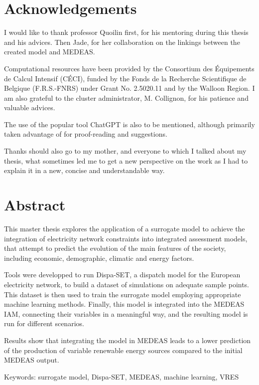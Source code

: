 \section*{Acknowledgements}

I would like to thank professor Quoilin first, for his mentoring during this thesis and his advices. Then Jade, for her collaboration on the linkings between the created model and MEDEAS.

Computational resources have been provided by the Consortium des Équipements de Calcul Intensif (CÉCI), funded by the Fonds de la Recherche Scientifique de Belgique (F.R.S.-FNRS) under Grant No. 2.5020.11 and by the Walloon Region. I am also grateful to the cluster administrator, M. Collignon, for his patience and valuable advices.

The use of the popular tool ChatGPT \cite{chatgpt} is also to be mentioned, although primarily taken advantage of for proof-reading and suggestions.

Thanks should also go to my mother, and everyone to which I talked about my thesis, what sometimes led me to get a new perspective on the work as I had to explain it in a new, concise and understandable way.

\newpage

\section*{Abstract}

This master thesis explores the application of a surrogate model to achieve the integration of electricity network constraints into integrated assessment models, that attempt to predict the evolution of the main features of the society, including economic, demographic, climatic and energy factors.

Tools were developped to run Dispa-SET, a dispatch model for the European electricity network, to build a dataset of simulations on adequate sample points. This dataset is then used to train the surrogate model employing appropriate machine learning methods. Finally, this model is integrated into the MEDEAS IAM, connecting their variables in a meaningful way, and the resulting model is run for different scenarios.

Results show that integrating the model in MEDEAS leads to a lower prediction of the production of variable renewable energy sources compared to the initial MEDEAS output.

\vspace{1cm}
Keywords: surrogate model, Dispa-SET, MEDEAS, machine learning, VRES

